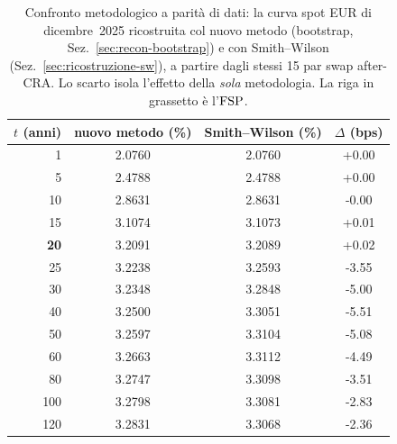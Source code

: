 \begin{table}[H]\centering\small
\caption{Confronto metodologico a parit\`a di dati: la curva spot EUR di dicembre~2025 ricostruita col nuovo metodo (bootstrap, Sez.~\ref{sec:recon-bootstrap}) e con Smith--Wilson (Sez.~\ref{sec:ricostruzione-sw}), a partire dagli stessi 15 par swap after-CRA. Lo scarto isola l'effetto della \emph{sola} metodologia. La riga in grassetto \`e l'$\mathrm{FSP}$.}
\label{tab:sw-vs-new-rivisto}\renewcommand{\arraystretch}{1.15}
\begin{tabular}{rccc}
\toprule
$t$ (anni) & nuovo metodo (\%) & Smith--Wilson (\%) & $\Delta$ (bps)\\
\midrule
\rowcolor{rowtint}1 & 2.0760 & 2.0760 & +0.00\\
5 & 2.4788 & 2.4788 & +0.00\\
\rowcolor{rowtint}10 & 2.8631 & 2.8631 & -0.00\\
15 & 3.1074 & 3.1073 & +0.01\\
\rowcolor{rowtint}\textbf{20} & 3.2091 & 3.2089 & +0.02\\
25 & 3.2238 & 3.2593 & -3.55\\
\rowcolor{rowtint}30 & 3.2348 & 3.2848 & -5.00\\
40 & 3.2500 & 3.3051 & -5.51\\
\rowcolor{rowtint}50 & 3.2597 & 3.3104 & -5.08\\
60 & 3.2663 & 3.3112 & -4.49\\
\rowcolor{rowtint}80 & 3.2747 & 3.3098 & -3.51\\
100 & 3.2798 & 3.3081 & -2.83\\
\rowcolor{rowtint}120 & 3.2831 & 3.3068 & -2.36\\
\bottomrule
\end{tabular}
\end{table}
